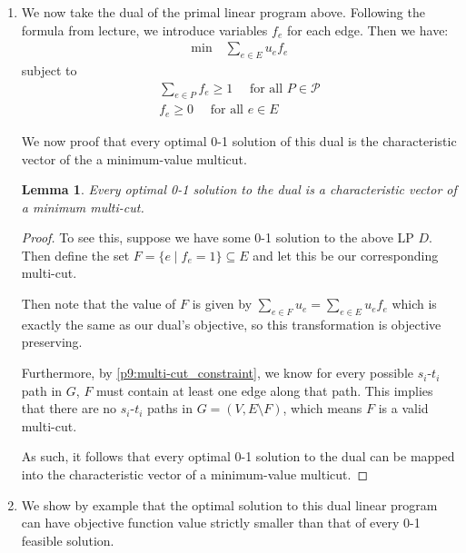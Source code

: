 \documentclass[12pt]{exam}
\newtheorem{lemma}[theorem]{Lemma}
\begin{document}
\begin{questions}
\begin{solution}
\begin{enumerate}[label=(\alph*)]
\begin{proof}
          Finally, for (3) simply note that the value of a flow corresponding to a feasible solution is precisely the sum of the flows along the simple s-t paths, which is the same as the objective function.
        \end{proof}

    \item 
      We now take the dual of the primal linear program above. Following the formula from lecture, we introduce variables $f_e$ for each edge. Then we have:
      \begin{align}
      \text{min} \quad \sum_{e \in E} u_e f_e
      \end{align}
      subject to
      \begin{align}
        \sum_{e \in P} f_e \geq 1 \quad \text{ for all } P \in \mathcal{P}  \label{p9:multi-cut_constraint} \\
        f_e \geq 0 \quad \text{ for all } e \in E
      \end{align}

      We now proof that every optimal 0-1 solution of this dual is the characteristic vector of the a minimum-value multicut.

      \begin{lemma}
        Every optimal 0-1 solution to the dual is a characteristic vector of a minimum multi-cut.
      \end{lemma}
      \begin{proof}
        To see this, suppose we have some 0-1 solution to the above LP $D$. Then define the set $F = \{ e \mid f_e = 1 \} \subseteq E$ and let this be our corresponding multi-cut.

        Then note that the value of $F$ is given by $\sum_{e \in F} u_e = \sum_{e \in E} u_e f_e$  which is exactly the same as our dual's objective, so this transformation is objective preserving.

        Furthermore, by \ref{p9:multi-cut_constraint}, we know for every possible $s_i$-$t_i$ path in $G$, $F$ must contain at least one edge along that path. This implies that there are no $s_i$-$t_i$ paths in $G = (V, E \setminus F)$, which means $F$ is a valid multi-cut.

        As such, it follows that every optimal 0-1 solution to the dual can be mapped into the characteristic vector of a minimum-value multicut.
      \end{proof}

    \item
      We show by example that the optimal solution to this dual linear program can have objective function value strictly smaller than that of every 0-1 feasible solution.


\end{enumerate}
\end{solution}
\end{questions}
\end{document}
